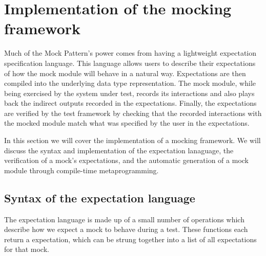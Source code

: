 \section{Implementation of the mocking framework}
\label{application:implementation}


Much of the Mock Pattern's power comes from having a lightweight
expectation specification language. This language allows users to
describe their expectations of how the mock module will behave in a
natural way. Expectations are then compiled into the underlying data
type representation. The mock module, while being exercised by the
system under test, records its interactions and also plays back the
indirect outputs recorded in the expectations. Finally, the
expectations are verified by the test framework by checking that the
recorded interactions with the mocked module match what was specified
by the user in the expectations.

In this section we will cover the implementation of a mocking
framework. We will discuss the syntax and implementation of the
expectation lanaguage, the verification of a mock's expectations, and
the automatic generation of a mock module through compile-time
metaprogramming.

\subsection{Syntax of the expectation language}
\label{application:syntax}

The expectation language is made up of a small number of operations
which describe how we expect a mock to behave during a test. These
functions each return a expectation, which can be strung together into
a list of all expectations for that mock.

